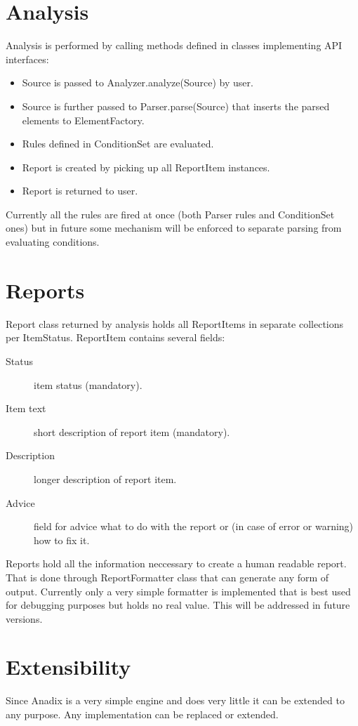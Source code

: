 \documentclass{report}
\begin{document}
\section{Analysis}
Analysis is performed by calling methods defined in classes implementing API
interfaces:
\begin{itemize}
  \item Source is passed to Analyzer.analyze(Source) by user.
  \item Source is further passed to Parser.parse(Source) that inserts the parsed
  elements to ElementFactory.
  \item Rules defined in ConditionSet are evaluated.
  \item Report is created by picking up all ReportItem instances.
  \item Report is returned to user.
\end{itemize}
Currently all the rules are fired at once (both Parser rules and ConditionSet
ones) but in future some mechanism will be enforced to separate parsing from
evaluating conditions.

\section{Reports}
Report class returned by analysis holds all ReportItems in separate collections
per ItemStatus. ReportItem contains several fields:
\begin{description}
  \item[Status] item status (mandatory).
  \item[Item text] short description of report item (mandatory).
  \item[Description] longer description of report item.
  \item[Advice] field for advice what to do with the report or (in case of
  error or warning) how to fix it.
\end{description}
Reports hold all the information neccessary to create a human readable report.
That is done through ReportFormatter class that can generate any form of output.
Currently only a very simple formatter is implemented that is best used for
debugging purposes but holds no real value. This will be addressed in future
versions.

\section{Extensibility}
Since Anadix is a very simple engine and does very little it can be extended to
any purpose. Any implementation can be replaced or extended.
\end{document}
